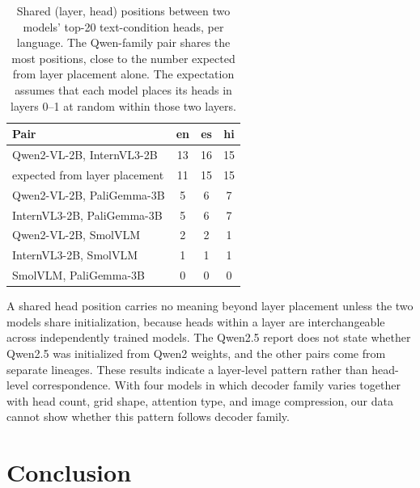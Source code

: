 \documentclass[10pt]{article}
\begin{document}
\begin{table}[t]
\centering
\caption{Shared (layer, head) positions between two models' top-20 text-condition heads, per language. The Qwen-family pair shares the most positions, close to the number expected from layer placement alone. The expectation assumes that each model places its heads in layers 0--1 at random within those two layers.}
\label{tab:crossmodel}
\begin{tabular}{l ccc}
\toprule
Pair & en & es & hi \\
\midrule
Qwen2-VL-2B, InternVL3-2B & 13 & 16 & 15 \\
\quad expected from layer placement & 11 & 15 & 15 \\
Qwen2-VL-2B, PaliGemma-3B & 5 & 6 & 7 \\
InternVL3-2B, PaliGemma-3B & 5 & 6 & 7 \\
Qwen2-VL-2B, SmolVLM & 2 & 2 & 1 \\
InternVL3-2B, SmolVLM & 1 & 1 & 1 \\
SmolVLM, PaliGemma-3B & 0 & 0 & 0 \\
\bottomrule
\end{tabular}
\end{table}

A shared head position carries no meaning beyond layer placement unless the two models share initialization, because heads within a layer are interchangeable across independently trained models. The Qwen2.5 report does not state whether Qwen2.5 was initialized from Qwen2 weights, and the other pairs come from separate lineages. These results indicate a layer-level pattern rather than head-level correspondence. With four models in which decoder family varies together with head count, grid shape, attention type, and image compression, our data cannot show whether this pattern follows decoder family.

\section{Conclusion}
\label{sec:conclusion}
\end{document}
